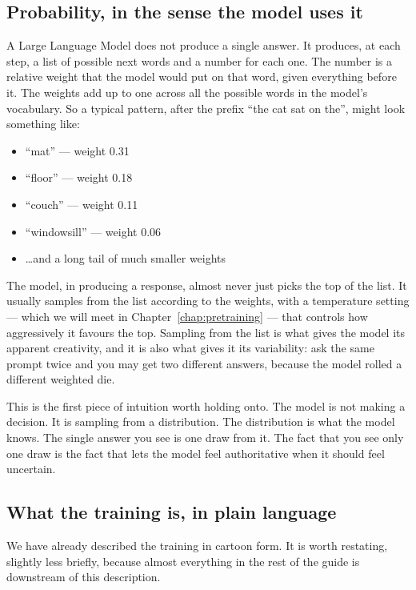 \subsection*{Probability, in the sense the model uses it}

A Large Language Model does not produce a single answer. It
produces, at each step, a list of possible next words and a
number for each one. The number is a relative weight that the
model would put on that word, given everything before it. The
weights add up to one across all the possible words in the
model's vocabulary. So a typical pattern, after the prefix ``the
cat sat on the'', might look something like:

\begin{itemize}
  \item ``mat'' --- weight 0.31
  \item ``floor'' --- weight 0.18
  \item ``couch'' --- weight 0.11
  \item ``windowsill'' --- weight 0.06
  \item \ldots and a long tail of much smaller weights
\end{itemize}

The model, in producing a response, almost never just picks the
top of the list. It usually samples from the list according to
the weights, with a temperature setting --- which we will meet
in Chapter~\ref{chap:pretraining} --- that controls how aggressively it favours the
top. Sampling from the list is what gives the model its apparent
creativity, and it is also what gives it its variability: ask
the same prompt twice and you may get two different answers,
because the model rolled a different weighted die.

This is the first piece of intuition worth holding onto. The
model is not making a decision. It is sampling from a
distribution. The distribution is what the model knows. The
single answer you see is one draw from it. The fact that you
see only one draw is the fact that lets the model feel
authoritative when it should feel uncertain.

\subsection*{What the training is, in plain language}

We have already described the training in cartoon form. It is
worth restating, slightly less briefly, because almost
everything in the rest of the guide is downstream of this
description.

